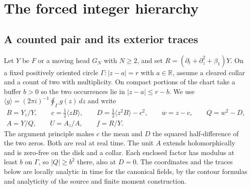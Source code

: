 \section{The forced integer hierarchy}\label{sec:hierarchy}

\subsection{A counted pair and its exterior traces}

Let \(Y\) be \(F\) or a moving head \(G_N\) with \(N\ge2\), and set
\(R=(\partial_t+\partial_z^2+\beta_1)Y\).
On a fixed positively oriented circle \(\Gamma:|z-a|=r\) with
\(a\in\mathbb R\), assume a cleared collar and a count of two with
multiplicity. On compact portions of the chart take a buffer \(b>0\)
so the two occurrences lie in \(|z-a|\le r-b\). We use
\(\langle g\rangle=(2\pi i)^{-1}\oint_\Gamma g(z)\,dz\) and write
\begin{equation}\label{h:coordinates}
\begin{gathered}
 B=Y_z/Y,\qquad c=\tfrac12\langle zB\rangle,\qquad
 D=\tfrac12\langle z^2B\rangle-c^2,\qquad
 w=z-c,\qquad Q=w^2-D,\\
 A=Y/Q,\qquad U=A_z/A,\qquad f=R/Y .
\end{gathered}
\end{equation}
The argument principle makes \(c\) the mean and \(D\) the squared
half-difference of the two zeros. Both are real at real time.
The unit \(A\) extends holomorphically and is zero-free on the disk
and a collar. Each enclosed factor has modulus at least \(b\) on
\(\Gamma\), so \(|Q|\ge b^2\) there, also at \(D=0\). The
coordinates and the traces below are locally analytic in time for
the canonical fields, by the contour formulas and analyticity of
the source and finite moment construction.

